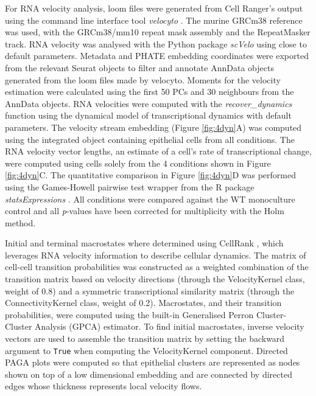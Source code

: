 For RNA velocity analysis, loom files were generated from Cell Ranger's output using the command line interface tool \textit{velocyto} \cite{la_manno_rna_2018}. The murine GRCm38 reference was used, with the GRCm38/mm10 repeat mask assembly and the RepeatMasker track. RNA velocity was analysed with the Python package \textit{scVelo} \cite{bergen_generalizing_2020} using close to default parameters. Metadata and PHATE embedding coordinates were exported from the relevant Seurat objects to filter and annotate AnnData objects generated from the loom files made by velocyto. Moments for the velocity estimation were calculated using the first 50 PCs and 30 neighbours from the AnnData objects. RNA velocities were computed with the \textit{recover\_dynamics} function using the dynamical model of transcriptional dynamics with default parameters. The velocity stream embedding (Figure \ref{fig:4dyn}A) was computed using the integrated object containing epithelial cells from all conditions. The RNA velocity vector lengths, an estimate of a cell's rate of transcriptional change, were computed using cells solely from the 4 conditions shown in Figure \ref{fig:4dyn}C. The quantitative comparison in Figure \ref{fig:4dyn}D was performed using the Games-Howell pairwise test wrapper from the R package \textit{statsExpressions} \cite{patil_statsexpressions_2021}. All conditions were compared against the WT monoculture control and all \textit{p}-values have been corrected for multiplicity with the Holm method.

Initial and terminal macrostates where determined using CellRank \cite{lange_cellrank_2022}, which leverages RNA velocity information to describe cellular dynamics. The matrix of cell-cell transition probabilities was constructed as a weighted combination of the transition matrix based on velocity directions (through the VelocityKernel class, weight of 0.8) and a symmetric transcriptional similarity matrix (through the ConnectivityKernel class, weight of 0.2). Macrostates, and their transition probabilities, were computed using the built-in Generalised Perron Cluster-Cluster Analysis (GPCA) estimator. To find initial macrostates, inverse velocity vectors are used to assemble the transition matrix by setting the backward argument to \texttt{True} when computing the VelocityKernel component. Directed PAGA plots \cite{wolf_paga_2019, lange_cellrank_2022} were computed so that epithelial clusters are represented as nodes shown on top of a low dimensional embedding and are connected by directed edges whose thickness represents local velocity flows.

